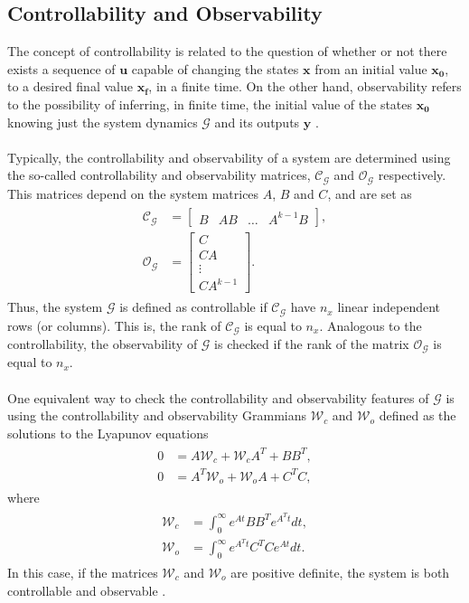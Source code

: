 \subsection{Controllability and Observability}
The concept of controllability is related to the question of whether or not there exists a sequence of $\mathbf{u}$ capable of changing the states $\mathbf{x}$ from an initial value $\mathbf{x_0}$, to a desired final value $\mathbf{x_f}$, in a finite time. On the other hand, observability refers to the possibility of inferring, in finite time, the initial value of the states $\mathbf{x_0}$ knowing just the system dynamics $\mathcal{G}$ and its outputs $\mathbf{y}$ \cite{controlability1981}.
\\\\
Typically, the controllability and observability of a system are determined using the so-called controllability and observability matrices, $\mathcal{C_{G}}$ and $\mathcal{O_{G}}$ respectively.
This matrices depend on the system matrices $A$, $B$ and $C$, and are set as
\begin{align}
\begin{split}
\mathcal{C_{G}} & =
\begin{bmatrix}
B &  AB & \hdots & A^{k-1}B
\end{bmatrix},\\[5px]
\mathcal{O_G} & = \begin{bmatrix}
C\\
CA\\
\vdots\\
CA^{k-1}
\end{bmatrix}.
\end{split}
\end{align}
Thus, the system $\mathcal{G}$ is defined as controllable if $\mathcal{C_G}$ have $\mathit{n_x}$ linear independent rows (or columns). This is, the rank of $\mathcal{C_G}$ is equal to $\mathit{n_x}$. Analogous to the controllability, the observability of $\mathcal{G}$ is checked if the rank of the matrix $\mathcal{O_G}$ is equal to $\mathit{n_x}$.
\\\\
One equivalent way to check the controllability and observability features of $\mathcal{G}$ is using the controllability and observability Grammians $\mathcal{W}_{c}$ and $\mathcal{W}_{o}$ defined as the solutions to the Lyapunov equations
\begin{align}
\begin{split}
0 & = A\mathcal{W}_{c} + \mathcal{W}_{c}A^{T} + BB^{T},\\[5px]
0 & = A^{T}\mathcal{W}_{o} + \mathcal{W}_{o}A + C^{T}C,
\end{split}
\end{align}
where
\begin{align}
\begin{split}
\mathcal{W}_{c} & = \int_{0}^{\infty}e^{At}BB^{T}e^{A^{T}t}dt,\\[5px]
\mathcal{W}_{o} & = \int_{0}^{\infty}e^{A^{T}t}C^{T}Ce^{At}dt.
\end{split}
\end{align}
In this case, if the matrices $\mathcal{W}_{c}$ and $\mathcal{W}_{o}$ are positive definite, the system is both controllable and observable \cite{Werner2012}.

